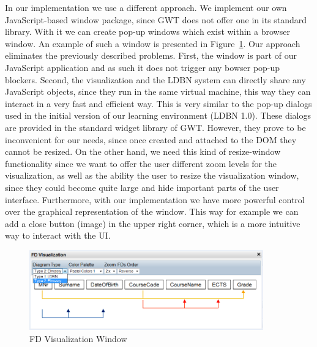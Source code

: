 In our implementation we use a different approach. We implement our own 
JavaScript-based window package, since GWT does not offer one in its standard library.
With it we can create pop-up windows which exist within a browser window. 
An example of such a window is presented in Figure~\ref{fig:fd-visual-win}. 
Our approach eliminates the previously described problems. First,
the window is part of our JavaScript application and as such it does not 
trigger any bowser pop-up blockers. 
Second, the visualization and the LDBN system can directly share any 
JavaScript objects, since they run in the same virtual machine, 
this way they can interact in a very fast and efficient way. 
This is very similar to the pop-up dialogs used in the initial version of our learning environment (LDBN 1.0). 
These dialogs are provided in the standard widget library of GWT. 
However, they prove to be inconvenient for our needs, since once created and attached 
to the DOM they cannot be resized. On the other hand, we
need this kind of resize-window functionality since we want to offer the user
different zoom levels for the visualization, as well as the ability the user to resize the
visualization window, since they could become quite large and hide important parts of the user 
interface. Furthermore, with our implementation we have more powerful control over
the graphical representation of the window. This way for example we can add a close button (image)
in the upper right corner, which is a more intuitive way to interact with the UI.

\begin{figure}[h]
	\begin{center}
		\includegraphics[width=0.9\textwidth]{./img/fd-visual-win.png}
		\caption{FD Visualization Window}
		\label{fig:fd-visual-win}
	\end{center}
\end{figure}

